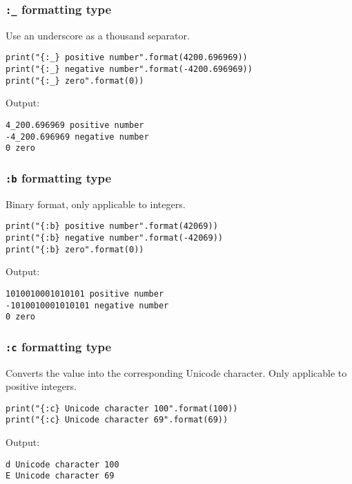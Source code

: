 \documentclass[11pt]{article}
\begin{document}
\subsubsection{\texttt{:\_} formatting type}
\label{sec:org5cf4952}
Use an underscore as a thousand separator.

\begin{verbatim}
print("{:_} positive number".format(4200.696969))
print("{:_} negative number".format(-4200.696969))
print("{:_} zero".format(0))
\end{verbatim}

 \noindent Output:

\label{orga3fe441}
\begin{verbatim}
4_200.696969 positive number
-4_200.696969 negative number
0 zero
\end{verbatim}
\subsubsection{\texttt{:b} formatting type}
\label{sec:org6ae1ad8}
Binary format, only applicable to integers.

\begin{verbatim}
print("{:b} positive number".format(42069))
print("{:b} negative number".format(-42069))
print("{:b} zero".format(0))
\end{verbatim}

 \noindent Output:

\label{orgc633091}
\begin{verbatim}
1010010001010101 positive number
-1010010001010101 negative number
0 zero
\end{verbatim}
\subsubsection{\texttt{:c} formatting type}
\label{sec:orgabd5a1c}
Converts the value into the corresponding Unicode character. Only applicable to positive integers.

\begin{verbatim}
print("{:c} Unicode character 100".format(100))
print("{:c} Unicode character 69".format(69))
\end{verbatim}

 \noindent Output:

\label{org3403811}
\begin{verbatim}
d Unicode character 100
E Unicode character 69
\end{verbatim}
\end{document}
